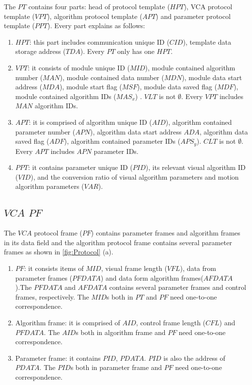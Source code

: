 \documentclass[journal,UTF8]{IEEEtran}
\begin{document}
 The $PT$ contains four parts: head of protocol template ($HPT$), VCA protocol template ($VPT$), algorithm protocol template ($APT$) and parameter protocol template ($PPT$). Every part explains as follows: 
 \begin{enumerate}
 	\item $HPT$: this part includes communication unique ID ($CID$), template data storage address ($TDA$). Every $PT$ only has one $HPT$.
 	\item $VPT$: it consists of module unique ID ($MID$), module contained algorithm number ($MAN$), module contained data number ($MDN$), module data start address ($MDA$), module start flag ($MSF$), module data saved flag ($MDF$), module contained algorithm IDs ($MAS_x$) . $VLT$ is not $\emptyset$. Every $VPT$ includes $MAN$ algorithm IDs. 
 	\item $APT$: it is comprised of algorithm unique ID ($AID$), algorithm contained parameter number ($APN$), algorithm data start address $ADA$, algorithm data saved flag ($ADF$), algorithm contained parameter IDs ($APS_y$). $CLT$ is not $\emptyset$. Every $APT$ includes $APN$ parameter IDs.
 	\item $PPT$: it contains parameter unique ID ($PID$), its relevant visual algorithm ID ($VID$), and the conversion ratio of visual algorithm parameters and motion algorithm parameters ($VAR$).  
 \end{enumerate}
 \subsection{$VCA$ $PF$}
 The $VCA$ protocol frame ($PF$) contains parameter frames and algorithm frames in its data field and the algorithm protocol frame contains several parameter frames as shown in \ref{fig:Protocol} (a). 

 \begin{enumerate}
	\item $PF$: it consists items of $MID$, visual frame length ($VFL$), data from parameter frames ($PFDATA$) and data form algorithm frames($AFDATA$).The $PFDATA$ and $AFDATA$ contains several parameter frames and control frames, respectively. The $MID$s both in $PT$ and $PF$ need one-to-one correspondence.
	\item Algorithm frame: it is comprised of $AID$, control frame length ($CFL$) and $PFDATA$. The $AID$s both in algorithm frame and $PF$ need one-to-one correspondence.
	\item Parameter frame: it contains $PID$, $PDATA$. $PID$ is also the address of $PDATA$. The $PID$s both in parameter frame and $PF$ need one-to-one correspondence.
\end{enumerate}
\end{document}
